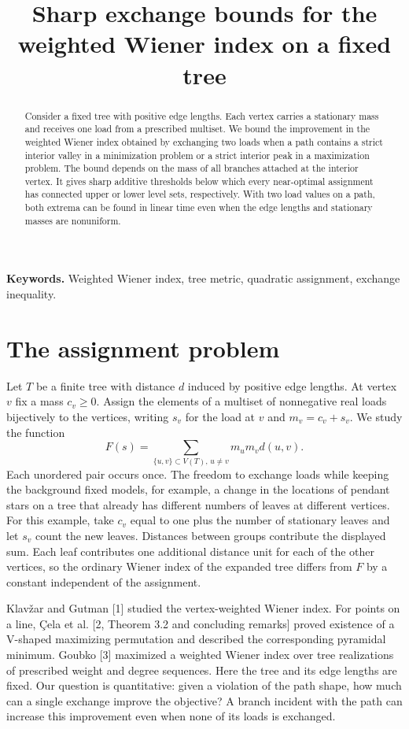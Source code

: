 \documentclass[11pt]{article}
\title{Sharp exchange bounds for the weighted Wiener index on a fixed tree}
\author{}
\date{}
\begin{document}
\maketitle
\begin{abstract}
Consider a fixed tree with positive edge lengths. Each vertex carries a stationary mass and receives one load from a prescribed multiset. We bound the improvement in the weighted Wiener index obtained by exchanging two loads when a path contains a strict interior valley in a minimization problem or a strict interior peak in a maximization problem. The bound depends on the mass of all branches attached at the interior vertex. It gives sharp additive thresholds below which every near-optimal assignment has connected upper or lower level sets, respectively. With two load values on a path, both extrema can be found in linear time even when the edge lengths and stationary masses are nonuniform.
\end{abstract}
\noindent\textbf{Keywords.} Weighted Wiener index, tree metric, quadratic assignment, exchange inequality.
\section{The assignment problem}
Let $T$ be a finite tree with distance $d$ induced by positive edge lengths. At vertex $v$ fix a mass $c_v\ge0$. Assign the elements of a multiset of nonnegative real loads bijectively to the vertices, writing $s_v$ for the load at $v$ and $m_v=c_v+s_v$. We study the function
\[
 F(s)=\sum_{\{u,v\}\subset V(T),\,u\ne v}m_um_vd(u,v).
\]
Each unordered pair occurs once. The freedom to exchange loads while keeping the background fixed models, for example, a change in the locations of pendant stars on a tree that already has different numbers of leaves at different vertices. For this example, take $c_v$ equal to one plus the number of stationary leaves and let $s_v$ count the new leaves. Distances between groups contribute the displayed sum. Each leaf contributes one additional distance unit for each of the other vertices, so the ordinary Wiener index of the expanded tree differs from $F$ by a constant independent of the assignment.

Klav\v{z}ar and Gutman [1] studied the vertex-weighted Wiener index. For points on a line, \c{C}ela et al. [2, Theorem 3.2 and concluding remarks] proved existence of a V-shaped maximizing permutation and described the corresponding pyramidal minimum. Goubko [3] maximized a weighted Wiener index over tree realizations of prescribed weight and degree sequences. Here the tree and its edge lengths are fixed. Our question is quantitative: given a violation of the path shape, how much can a single exchange improve the objective? A branch incident with the path can increase this improvement even when none of its loads is exchanged.
\end{document}
